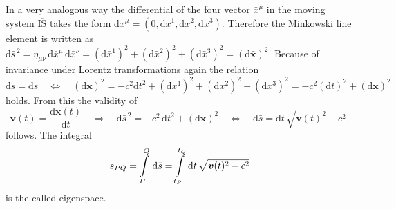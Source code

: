 \documentclass[a4paper,11pt]{article}
\numberwithin{equation}{section}
\newcommand\vect[1]{\ensuremath{\bm{#1}}}
\begin{document}
{In a very analogous way the differential of the four vector $\bar{x}^\mu$ in the moving system $\overline{\textrm{IS}}$ takes the form $\mathrm{d}\bar{x}^\mu = (0,\mathrm{d}\bar{x}^1,\mathrm{d}\bar{x}^2,\mathrm{d}\bar{x}^3)$. Therefore the Minkowski line element is written as $\mathrm{d}\bar{s}^{\,2} = \eta_{\mu\nu}\,\mathrm{d}\bar{x}^\mu\,\mathrm{d}\bar{x}^\nu = (\mathrm{d}\bar{x}^1)^2+(\mathrm{d}\bar{x}^2)^2+(\mathrm{d}\bar{x}^3)^2 = (\mathrm{d}\bar{\vect{x}})^2$. Because of invariance under Lorentz transformations again the relation \begin{equation}
\mathrm{d}\bar{s} = \mathrm{d}s \quad \Leftrightarrow \quad (\mathrm{d}\bar{\vect{x}})^2 = -c^2\mathrm{d}t^2 + (\mathrm{d}x^1)^2 + (\mathrm{d}x^2)^2 + (\mathrm{d}x^3)^2 = -c^2(\mathrm{d}t)^2 + (\mathrm{d}\vect{x})^2
\end{equation} holds. From this the validity of \begin{equation}
\vect{v}(t) = \frac{\mathrm{d}\vect{x}(t)}{\mathrm{d}t} \quad \Rightarrow \quad \mathrm{d}\bar{s}^{\,2} = -c^2\,\mathrm{d}t^2+(\mathrm{d}\vect{x})^2 \quad \Leftrightarrow \quad \mathrm{d}\bar{s} = \mathrm{d}t\,\sqrt{\vect{v}(t)^2-c^2}.
\end{equation} follows. The integral \begin{equation}
s_{PQ} = \int\displaylimits_{P}^{Q} \, \mathrm{d}\bar{s} = \int\displaylimits_{t_P}^{t_Q}\,\mathrm{d}t\,\sqrt{\vect{v}(t)^2-c^2}
\end{equation} is the called eigenspace.
}
\end{document}
